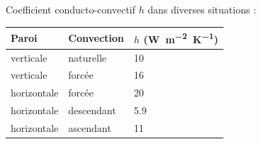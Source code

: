 Coefficient conducto-convectif $h$ dans diverses situations :

\begin{center}
\begin{tabular*}{\columnwidth}{@{\extracolsep{\fill}} lll}
\toprule
\textbf{Paroi} & \textbf{Convection} & $h$ (\si{W.m^{-2}.K^{-1}}) \\
\midrule
verticale & naturelle & \num{10} \\
verticale & forcée & \num{16} \\
horizontale & forcée & \num{20} \\
horizontale & descendant & \num{5.9} \\
horizontale & ascendant & \num{11} \\
\bottomrule
\end{tabular*}
\end{center}



